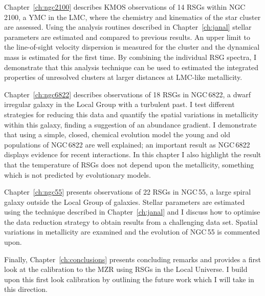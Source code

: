 Chapter~\ref{ch:ngc2100} describes KMOS observations of 14 RSGs within NGC\,2100, a YMC in the LMC, where the chemistry and kinematics of the star cluster are assessed.
Using the analysis routines described in Chapter~\ref{ch:janal} stellar parameters are estimated and compared to previous results. An upper limit to the line-of-sight velocity dispersion is measured for the cluster and the dynamical mass is estimated for the first time.
By combining the individual RSG spectra, I demonstrate that this analysis technique can be used to estimated the integrated properties of unresolved clusters at larger distances at LMC-like metallicity.

Chapter~\ref{ch:ngc6822} describes observations of 18 RSGs in NGC\,6822, a dwarf irregular galaxy in the Local Group with a turbulent past.
I test different strategies for reducing this data and quantify the spatial variations in metallicity within this galaxy, finding a suggestion of an abundance gradient.
I demonstrate that using a simple, closed, chemical evolution model the young and old populations of NGC\,6822 are well explained; an important result as NGC\,6822 displays evidence for recent interactions.
In this chapter I also highlight the result that the temperature of RSGs does not depend upon the metallicity, something which is not predicted by evolutionary models.

Chapter~\ref{ch:ngc55} presents observations of 22 RSGs in NGC\,55, a large spiral galaxy outside the Local Group of galaxies.
Stellar parameters are estimated using the technique described in Chapter~\ref{ch:janal} and I discuss how to optimise the data reduction strategy to obtain results from a challenging data set.
Spatial variations in metallicity are examined and the evolution of NGC\,55 is commented upon.


Finally, Chapter~\ref{ch:conclusions} presents concluding remarks and provides a first look at the calibration to the MZR using RSGs in the Local Universe.
I build upon this first look calibration by outlining the future work which I will take in this direction.

% 

